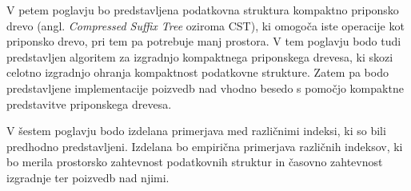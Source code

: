 
V petem poglavju bo predstavljena podatkovna struktura kompaktno priponsko drevo (angl. \textit{Compressed Suffix Tree} oziroma CST), ki omogoča iste operacije kot priponsko drevo, pri tem pa potrebuje manj prostora. V tem poglavju bodo tudi predstavljen algoritem za izgradnjo kompaktnega priponskega drevesa, ki skozi celotno izgradnjo ohranja kompaktnost podatkovne strukture. Zatem pa bodo predstavljene implementacije poizvedb nad vhodno besedo s pomočjo kompaktne predstavitve priponskega drevesa.

V šestem poglavju bodo izdelana primerjava med različnimi indeksi, ki so bili predhodno predstavljeni. Izdelana bo empirična primerjava različnih indeksov, ki bo merila prostorsko zahtevnost podatkovnih struktur in časovno zahtevnost izgradnje ter poizvedb nad njimi.